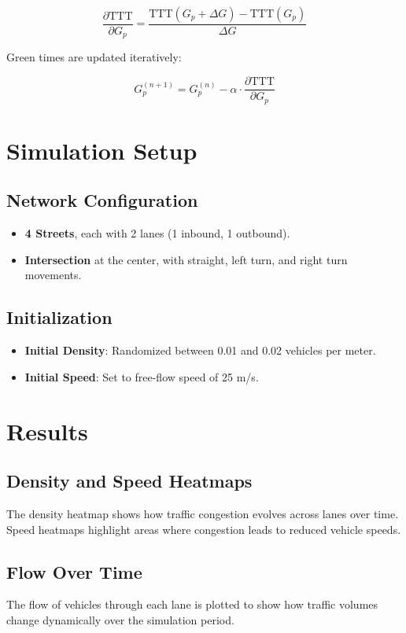 \documentclass[conference]{IEEEtran}
\begin{document}
\begin{equation}
\frac{\partial \text{TTT}}{\partial G_p} = \frac{\text{TTT}(G_p + \Delta G) - \text{TTT}(G_p)}{\Delta G}
\end{equation}

Green times are updated iteratively:

\begin{equation}
G_p^{(n+1)} = G_p^{(n)} - \alpha \cdot \frac{\partial \text{TTT}}{\partial G_p}
\end{equation}

\section{Simulation Setup}

\subsection{Network Configuration}
\begin{itemize}
    \item \textbf{4 Streets}, each with 2 lanes (1 inbound, 1 outbound).
    \item \textbf{Intersection} at the center, with straight, left turn, and right turn movements.
\end{itemize}

\subsection{Initialization}
\begin{itemize}
    \item \textbf{Initial Density}: Randomized between 0.01 and 0.02 vehicles per meter.
    \item \textbf{Initial Speed}: Set to free-flow speed of 25 m/s.
\end{itemize}

\section{Results}

\subsection{Density and Speed Heatmaps}
The density heatmap shows how traffic congestion evolves across lanes over time. Speed heatmaps highlight areas where congestion leads to reduced vehicle speeds.

\subsection{Flow Over Time}
The flow of vehicles through each lane is plotted to show how traffic volumes change dynamically over the simulation period.
\end{document}

